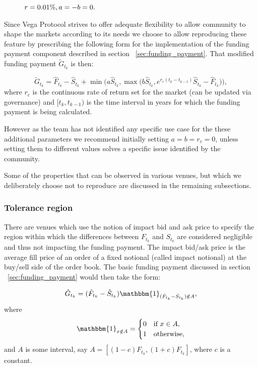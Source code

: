 \documentclass[10pt]{article}
\begin{document}
\begin{figure}[!htb]
  \caption{$\\r=0.01\%, a=-b=0.$}\label{fig:clamp3}
\endminipage
\end{figure}

Since Vega Protocol strives to offer adequate flexibility to allow community to shape the markets according to its needs we choose to allow reproducing these feature by prescribing the following form for the implementation of the funding payment component described in section ~\ref{sec:funding_payment}. That modified funding payment $\tilde G_{t_k}$ is then:

$$
\tilde G_{t_k} = \hat F_{t_k} - \hat S_{t_k} + \min \Bigg (a\hat S_{t_k},\max \bigg(b\hat S_{t_k}, e^{r_c(t_k-t_{k-1})} \hat S_{t_k} - \hat F_{t_k} \bigg ) \Bigg ), 
$$
where $r_c$ is the continuous rate of return set for the market (can be updated via governance) and $[t_k,t_{k-1})$ is the time interval in years for which the funding payment is being calculated.

However as the team has not identified any specific use case for the these additional parameters we recommend initially setting $a=b=r_c=0$, unless setting them to different values solves a specific issue identified by the community.

Some of the properties that can be observed in various venues, but which we deliberately choose not to reproduce are discussed in the remaining subsections.

\subsubsection{Tolerance region}

There are venues which use the notion of impact bid and ask price to specify the region within which the differences between $F_{t_k}$ and $S_{t_k}$ are considered negligible and thus not impacting the funding payment. The impact bid/ask price is the average fill price of an order of a fixed notional (called impact notional) at the buy/sell side of the order book. The basic funding payment discussed in section ~\ref{sec:funding_payment} would then take the form:

$$
 \hat G_{t_k} = (\hat F_{t_k} - \hat S_{t_k})\mathbbm{1}_{ (\hat F_{t_k} - \hat S_{t_k}) \notin A },
$$
where
$$
\mathbbm{1}_{ x \notin A } = \begin{cases}
    0 & \text{if } x \in A,\\
    1              & \text{otherwise,}
\end{cases}
$$ 
and $A$ is some interval, say $A=[(1-c)F_{t_k},(1+c)F_{t_k}]$, where $c$ is a constant.
\end{document}
